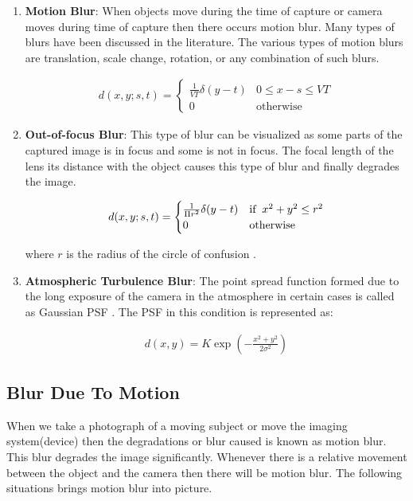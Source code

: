 \documentclass{article}
\begin{document}
\begin{enumerate}
    \item \textbf{Motion Blur}: When objects move during the time of capture or camera moves during time of capture then there occurs motion blur. Many types of blurs have been discussed in the literature. The various types of motion blurs are translation, scale change, rotation, or any combination of such blurs. 
    
    \begin{align}
        d(x, y ; s, t) = \begin{cases}
            \frac{1}{VT} \delta(y - t) & 0 \leq x - s \leq VT \\
            0 & \text{otherwise}
        \end{cases}
    \end{align}
    
    \item \textbf{Out-of-focus Blur}: This type of blur can be visualized as some parts of the captured image is in focus and some is not in focus. The focal length of the lens its distance with the object causes this type of blur and finally degrades the image.
    
    \begin{align}
        d(x, y ; s, t) = \begin{cases}
            \frac{1}{\Pi r^2} \delta(y - t) & \text{if} \hspace{.2cm} x^2 + y^2 \leq r^2 \\
            0 & \text{otherwise}
        \end{cases}
    \end{align}
    
    where $r$ is the radius of the circle of confusion \cite{jain-anil}.
    
    \item \textbf{Atmospheric Turbulence Blur}: The point spread function formed due to the long exposure of the camera in the atmosphere in certain cases is called as Gaussian PSF \cite{gonzalez-woods}. The PSF in this condition is represented as:
    
    \begin{align}
        d(x, y) = K    \exp\left(-\frac{x^2 + y^2}{2 \sigma^2}\right)
    \end{align}
\end{enumerate}

\subsection{Blur Due To Motion}
When we take a photograph of a moving subject or move the imaging system(device) then the degradations or blur caused is known as motion blur. This blur degrades the image significantly. Whenever there is a relative movement between the object and the camera then there will be motion blur. The following situations brings motion blur into picture. \\
\end{document}
